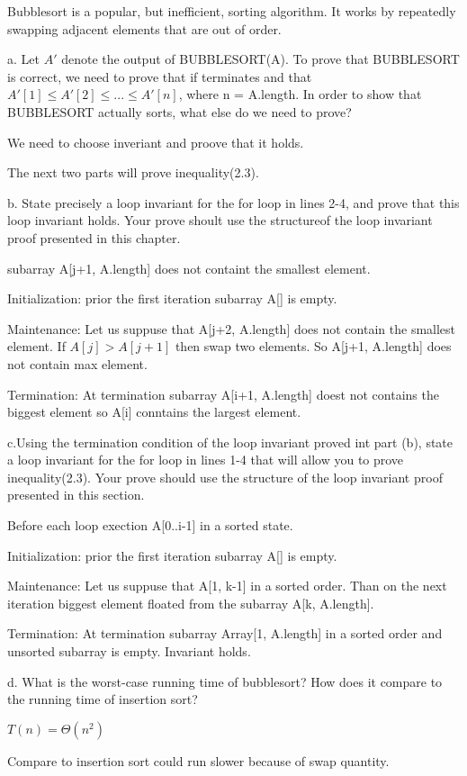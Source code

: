 \documentclass{article}
\begin{document}
Bubblesort is a popular, but inefficient, sorting algorithm. It works by repeatedly swapping adjacent elements that are out of order.

a. Let $A'$ denote the output of BUBBLESORT(A). To prove that BUBBLESORT is correct, we need to prove that if terminates and that
$A'[1] \le A'[2] \le ... \le A'[n]  $, where n = A.length. In order to show that BUBBLESORT actually sorts, what else do we need to prove?

We need to choose inveriant and proove that it holds.

The next two parts will prove inequality(2.3).

b. State precisely a loop invariant for the for loop in lines 2-4, and prove that this loop invariant holds. Your prove shoult use the structureof the loop invariant proof presented in this chapter.

subarray A[j+1, A.length] does not containt the smallest element.

Initialization: prior the first iteration subarray A[] is empty.

Maintenance: Let us suppuse that A[j+2, A.length] does not contain the smallest element. If $A[j]> A[j+1]$ then swap two elements. So A[j+1, A.length] does not contain max element.

Termination: At termination  subarray A[i+1, A.length] doest not contains the biggest element so A[i] conntains the largest element.


c.Using the termination condition of the loop invariant proved int part (b), state a loop invariant for the for loop in lines 1-4 that will allow you to prove inequality(2.3). Your prove should use the structure of the loop invariant proof presented in this section.   

Before each loop exection A[0..i-1] in a sorted state.

Initialization: prior the first iteration subarray A[] is empty.

Maintenance: Let us suppuse that A[1, k-1] in a sorted order. Than on the next iteration biggest element floated from the subarray A[k, A.length].

Termination: At termination  subarray Array[1, A.length] in a sorted order and unsorted subarray is empty. Invariant holds.

d. What is the worst-case running time of bubblesort? How does it compare to the running time of insertion sort?

$T(n)=\Theta(n^2)$

Compare to insertion sort could run slower because of swap quantity.
\end{document}
